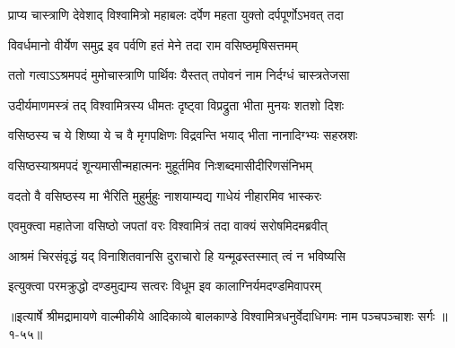 \twolineshloka
{प्राप्य चास्त्राणि देवेशाद् विश्वामित्रो महाबलः}
{दर्पेण महता युक्तो दर्पपूर्णोऽभवत् तदा} %

\twolineshloka
{विवर्धमानो वीर्येण समुद्र इव पर्वणि}
{हतं मेने तदा राम वसिष्ठमृषिसत्तमम्} %

\twolineshloka
{ततो गत्वाऽऽश्रमपदं मुमोचास्त्राणि पार्थिवः}
{यैस्तत् तपोवनं नाम निर्दग्धं चास्त्रतेजसा} %

\twolineshloka
{उदीर्यमाणमस्त्रं तद् विश्वामित्रस्य धीमतः}
{दृष्ट्वा विप्रद्रुता भीता मुनयः शतशो दिशः} %

\twolineshloka
{वसिष्ठस्य च ये शिष्या ये च वै मृगपक्षिणः}
{विद्रवन्ति भयाद् भीता नानादिग्भ्यः सहस्रशः} %

\twolineshloka
{वसिष्ठस्याश्रमपदं शून्यमासीन्महात्मनः}
{मुहूर्तमिव निःशब्दमासीदीरिणसंनिभम्} %

\twolineshloka
{वदतो वै वसिष्ठस्य मा भैरिति मुहुर्मुहुः}
{नाशयाम्यद्य गाधेयं नीहारमिव भास्करः} %

\twolineshloka
{एवमुक्त्वा महातेजा वसिष्ठो जपतां वरः}
{विश्वामित्रं तदा वाक्यं सरोषमिदमब्रवीत्} %

\twolineshloka
{आश्रमं चिरसंवृद्धं यद् विनाशितवानसि}
{दुराचारो हि यन्मूढस्तस्मात् त्वं न भविष्यसि} %

\twolineshloka
{इत्युक्त्वा परमक्रुद्धो दण्डमुद्यम्य सत्वरः}
{विधूम इव कालाग्निर्यमदण्डमिवापरम्} %


॥इत्यार्षे श्रीमद्रामायणे वाल्मीकीये आदिकाव्ये बालकाण्डे विश्वामित्रधनुर्वेदाधिगमः नाम पञ्चपञ्चाशः सर्गः ॥१-५५॥
